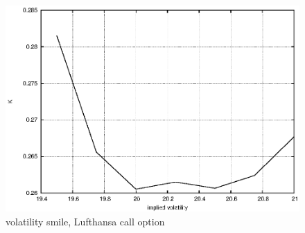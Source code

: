 \documentclass[]{article}
\begin{document}
\begin{figure}[!ht]
\centering
\includegraphics[width=.9\textwidth]{task9.eps}
\caption{volatility smile, Lufthansa call option}
\label{fig:Task9}
\end{figure}
\end{document}

